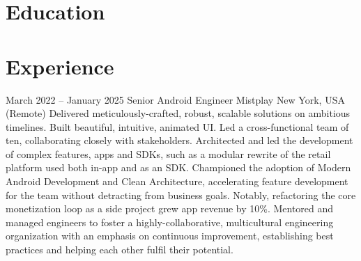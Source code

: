 \documentclass[10pt,a4paper,sans]{moderncv} %
\newcommand{\vs}[0]{\smallskip}
\begin{document}
\makecvtitle %
\vspace{-1cm}


\section{Education}

\vs
{}



\section{Experience}


\cventry
{March 2022 -- January 2025}
{Senior Android Engineer}
{{Mistplay}}
{New York, USA (Remote)}
{}{
	Delivered meticulously-crafted, robust, scalable solutions on ambitious timelines. Built beautiful, intuitive, animated UI.
	Led a cross-functional team of ten, collaborating closely with stakeholders.
	Architected and led the development of complex features, apps and SDKs, such as a modular rewrite of the retail platform used both in-app and as an SDK.
	Championed the adoption of Modern Android Development and Clean Architecture, accelerating feature development for the team without detracting from business goals. Notably, refactoring the core monetization loop as a side project grew app revenue by 10\%.
	Mentored and managed engineers to foster a highly-collaborative, multicultural engineering organization with an emphasis on continuous improvement, establishing best practices and helping each other fulfil their potential.
}\vs
\end{document}
